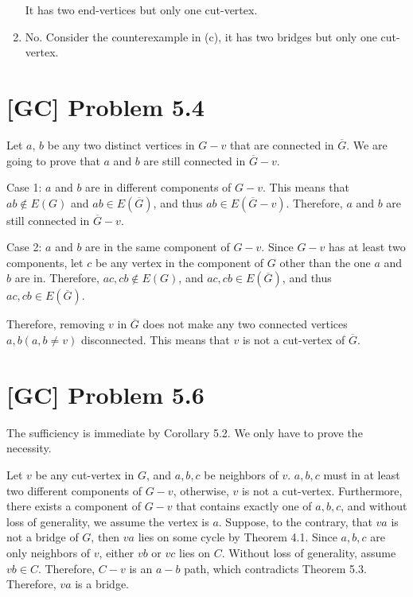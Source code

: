 \documentclass[a4paper,11pt,twocolumn]{article}
\begin{document}
\begin{enumerate}
\begin{center}
    \end{center} \par
    \normalsize
    It has two end-vertices but only one cut-vertex.
  \item No. Consider the counterexample in (c), it has two bridges but only one cut-vertex.
  \end{enumerate}

  \section{[GC] Problem 5.4}
  Let $a$, $b$ be any two distinct vertices in $G - v$ that are connected in $\overline{G}$. We are going to prove that $a$ and $b$ are still connected in $\overline{G} - v$. \par
  Case 1: $a$ and $b$ are in different components of $G - v$. This means that $ab \notin E(G)$ and $ab \in E(\overline{G})$, and thus $ab \in E(\overline{G} - v)$. Therefore, $a$ and $b$ are still connected in $\overline{G} - v$. \par
  Case 2: $a$ and $b$ are in the same component of $G - v$. Since $G -v$ has at least two components, let $c$ be any vertex in the component of $G$ other than the one $a$ and $b$ are in. Therefore, $ac, cb \notin E(G)$, and $ac, cb \in E(\overline{G})$, and thus $ac, cb \in E(\overline{G})$. \par
  Therefore, removing $v$ in $\overline{G}$ does not make any two connected vertices $a, b (a, b \neq v)$ disconnected. This  means that $v$ is not a cut-vertex of $\overline{G}$.

  \section{[GC] Problem 5.6}
  The sufficiency is immediate by Corollary 5.2. We only have to prove the necessity. \par
  Let $v$ be any cut-vertex in $G$, and $a, b, c$ be neighbors of $v$. $a, b, c$ must in at least two different components of $G - v$, otherwise, $v$ is not a cut-vertex. Furthermore, there exists a component of $G - v$ that contains exactly one of $a, b, c$,  and without loss of generality, we assume the vertex is $a$. Suppose, to the contrary, that $va$ is not a bridge of $G$, then $va$ lies on some cycle by Theorem 4.1. Since $a, b, c$ are only neighbors of $v$, either $vb$ or $vc$ lies on $C$. Without loss of generality, assume $vb \in C$. Therefore, $C - {v}$ is an $a-b$ path, which contradicts Theorem 5.3. Therefore, $va$ is a bridge. \par
\end{document}
